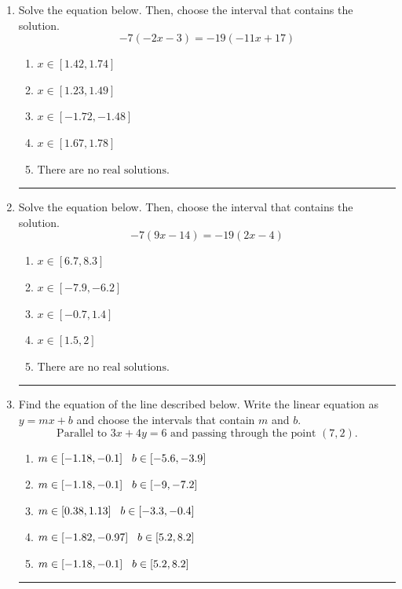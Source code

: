 \documentclass[14pt]{extbook}
\newcommand{\litem}[1]{\item#1\hspace*{-1cm}\rule{\textwidth}{0.4pt}}
\begin{document}
\begin{enumerate}
{\begin{enumerate}[label=\Alph*.]
\end{enumerate} }
\litem{
Solve the equation below. Then, choose the interval that contains the solution.\[ -7(-2x -3) = -19(-11x + 17) \]\begin{enumerate}[label=\Alph*.]
\item \( x \in [1.42, 1.74] \)
\item \( x \in [1.23, 1.49] \)
\item \( x \in [-1.72, -1.48] \)
\item \( x \in [1.67, 1.78] \)
\item \( \text{There are no real solutions.} \)

\end{enumerate} }
\litem{
Solve the equation below. Then, choose the interval that contains the solution.\[ -7(9x -14) = -19(2x -4) \]\begin{enumerate}[label=\Alph*.]
\item \( x \in [6.7, 8.3] \)
\item \( x \in [-7.9, -6.2] \)
\item \( x \in [-0.7, 1.4] \)
\item \( x \in [1.5, 2] \)
\item \( \text{There are no real solutions.} \)

\end{enumerate} }
\litem{
Find the equation of the line described below. Write the linear equation as $ y=mx+b $ and choose the intervals that contain $m$ and $b$.\[ \text{Parallel to } 3 x + 4 y = 6 \text{ and passing through the point } (7, 2). \]\begin{enumerate}[label=\Alph*.]
\item \( m \in [-1.18, -0.1] \hspace*{3mm} b \in [-5.6, -3.9] \)
\item \( m \in [-1.18, -0.1] \hspace*{3mm} b \in [-9, -7.2] \)
\item \( m \in [0.38, 1.13] \hspace*{3mm} b \in [-3.3, -0.4] \)
\item \( m \in [-1.82, -0.97] \hspace*{3mm} b \in [5.2, 8.2] \)
\item \( m \in [-1.18, -0.1] \hspace*{3mm} b \in [5.2, 8.2] \)


\end{enumerate}}
\end{enumerate}
\end{document}
